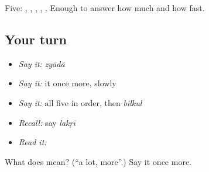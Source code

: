 \begin{grammarlens}[title={What you've built}]
Five: , , , , . Enough to answer how much and how fast.
\end{grammarlens}

\subsection*{Your turn}
\begin{itemize}
\raggedright
  \item \emph{Say it:} \emph{zyādā}
  \item \emph{Say it:} it once more, slowly
  \item \emph{Say it:} all five in order, then \emph{bilkul}
  \item \emph{Recall:} say \emph{lakṛī}
  \item \emph{Read it:} \textbf{}
\end{itemize}

\begin{tcolorbox}[breakable,colback=teal!4,colframe=teal!35!black,title={Before you move on}]
What does  mean? (\textquotedblleft{}a lot, more\textquotedblright{}.) Say it once more.
\end{tcolorbox}
